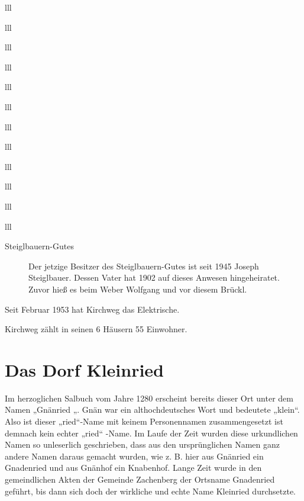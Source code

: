 \documentclass[12pt,a4pager]{book}
\begin{document}
\begin{tabuluar}{lll}
\begin{tabuluar}{lll}
\begin{tabuluar}{lll}
\begin{tabuluar}{lll}
\begin{tabuluar}{lll}
\begin{tabuluar}{lll}
\begin{tabuluar}{lll}
\begin{tabuluar}{lll}
\begin{tabuluar}{lll}
\begin{tabuluar}{lll}
\begin{tabuluar}{lll}
\begin{tabuluar}{lll}
\begin{description}
\item[Steiglbauern-Gutes] Der jetzige Besitzer des Steiglbauern-Gutes ist seit
1945 Joseph Steiglbauer. Dessen Vater hat 1902 auf dieses Anwesen hingeheiratet.
Zuvor hieß es beim Weber Wolfgang und vor diesem Brückl.
\end{description}

Seit Februar 1953 hat Kirchweg das Elektrische.

Kirchweg zählt in seinen 6 Häusern 55 Einwohner.

\section{Das Dorf Kleinried}

Im herzoglichen Salbuch vom Jahre 1280 erscheint bereits dieser Ort unter dem
Namen „Gnänried „. Gnän war ein althochdeutsches Wort und bedeutete „klein“.
Also ist dieser „ried“-Name mit keinem Personennamen zusammengesetzt ist demnach
kein echter „ried“ -Name. Im Laufe der Zeit wurden diese urkundlichen Namen so
unleserlich geschrieben, dass aus den ursprünglichen Namen ganz andere Namen
daraus gemacht wurden, wie z. B. hier aus Gnänried ein Gnadenried und aus
Gnänhof ein Knabenhof. Lange Zeit wurde in den gemeindlichen Akten der Gemeinde
Zachenberg der Ortsname Gnadenried geführt, bis dann sich doch der wirkliche und
echte Name Kleinried durchsetzte.


\end{tabuluar}
\end{tabuluar}
\end{tabuluar}
\end{tabuluar}
\end{tabuluar}
\end{tabuluar}
\end{tabuluar}
\end{tabuluar}
\end{tabuluar}
\end{tabuluar}
\end{tabuluar}
\end{tabuluar}
\end{document}
